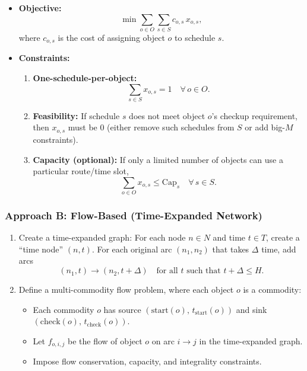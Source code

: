 \begin{itemize}
  \item \textbf{Objective:}
  \[
    \min \sum_{o \in O} \sum_{s \in S} c_{o,s}\, x_{o,s},
  \]
  where $c_{o,s}$ is the cost of assigning object $o$ to schedule $s$.

  \item \textbf{Constraints:}
  \begin{enumerate}
    \item \textbf{One-schedule-per-object:}
    \[
      \sum_{s \in S} x_{o,s} = 1 
      \quad \forall\, o \in O.
    \]
    \item \textbf{Feasibility:} If schedule $s$ does not meet object $o$'s checkup requirement, then $x_{o,s}$ must be 0 (either remove such schedules from $S$ or add big-$M$ constraints).
    \item \textbf{Capacity (optional):} If only a limited number of objects can use a particular route/time slot,
    \[
      \sum_{o \in O} x_{o,s} \le \mathrm{Cap}_s 
      \quad \forall\, s \in S.
    \]
  \end{enumerate}
\end{itemize}

\subsubsection*{Approach B: Flow-Based (Time-Expanded Network)}

\begin{enumerate}
  \item Create a time-expanded graph: For each node $n \in N$ and time $t \in T$, create a ``time node'' $(n,t)$. For each original arc $(n_1, n_2)$ that takes $\Delta$ time, add arcs
  \[
    (n_1, t) \to (n_2, t+\Delta)
    \quad
    \text{for all } t \text{ such that } t+\Delta \le H.
  \]

  \item Define a multi-commodity flow problem, where each object $o$ is a commodity:
  \begin{itemize}
    \item Each commodity $o$ has source $(\mathrm{start}(o),\,t_{\mathrm{start}}(o))$ and sink $(\mathrm{check}(o),\,t_{\mathrm{check}}(o))$.
    \item Let $f_{o,i,j}$ be the flow of object $o$ on arc $i \to j$ in the time-expanded graph.
    \item Impose flow conservation, capacity, and integrality constraints.
  \end{itemize}
\end{enumerate}

